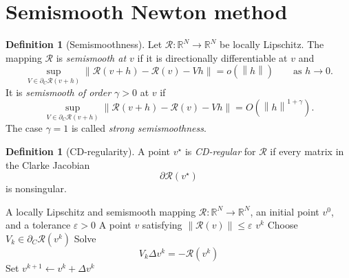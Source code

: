 \documentclass[a4paper,11pt]{book}
\theoremstyle{plain}
\theoremstyle{definition}
\newtheorem{definition}[theorem]{Definition}
\theoremstyle{remark}
\numberwithin{equation}{chapter}
\numberwithin{algorithm}{chapter}
\newcommand{\R}{\mathbb{R}}
\newcommand{\norm}[1]{\left\|#1\right\|}
\begin{document}
	\section{Semismooth Newton method}
	\begin{definition}[Semismoothness]
		Let \(\mathcal R:\R^N\to\R^N\) be locally Lipschitz. The mapping
		\(\mathcal R\) is \emph{semismooth at \(v\)} if it is directionally
		differentiable at \(v\) and
		\begin{equation}
			\sup_{V\in\partial_C\mathcal R(v+h)}
			\norm{
				\mathcal R(v+h)-\mathcal R(v)-Vh
			}
			=
			o(\norm{h})
			\qquad
			\text{as }h\to0.
			\label{eq:semismoothness}
		\end{equation}
		It is \emph{semismooth of order \(\gamma>0\)} at \(v\) if
		\begin{equation}
			\sup_{V\in\partial_C\mathcal R(v+h)}
			\norm{
				\mathcal R(v+h)-\mathcal R(v)-Vh
			}
			=
			O(\norm{h}^{1+\gamma}).
			\label{eq:semismoothness-order}
		\end{equation}
		The case \(\gamma=1\) is called \emph{strong semismoothness}.
	\end{definition}
	
	\begin{definition}[CD-regularity]
		A point \(v^\star\) is \emph{CD-regular} for \(\mathcal R\) if every matrix
		in the Clarke Jacobian
		\[
		\partial\mathcal R(v^\star)
		\]
		is nonsingular.
	\end{definition}
	
	\begin{algorithm}[H]
		\caption{Semismooth Newton method}
		\begin{algorithmic}[1]
			\Require A locally Lipschitz and semismooth mapping
			\(\mathcal R:\R^N\to\R^N\), an initial point \(v^0\), and a tolerance
			\(\varepsilon>0\)
			\Ensure A point \(v\) satisfying \(\norm{\mathcal R(v)}\leq\varepsilon\)
			\If{\(\norm{\mathcal R(v^k)}\leq\varepsilon\)}
			\State \Return \(v^k\)
			\EndIf
			\State Choose \(V_k\in\partial_C\mathcal R(v^k)\)
			\State Solve
			\[
			V_k\Delta v^k=-\mathcal R(v^k)
			\]
			\State Set \(v^{k+1}\gets v^k+\Delta v^k\)
			\EndFor
		\end{algorithmic}
	\end{algorithm}
	
\end{document}
